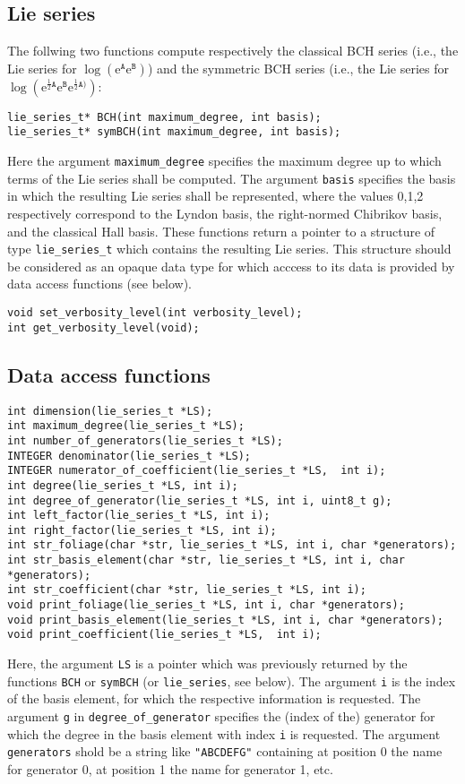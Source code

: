 \documentclass[11pt,a4paper]{article}
\newcommand{\ee}{\mathrm{e}}
\renewcommand{\AA}{\mathtt{A}}
\newcommand{\BB}{\mathtt{B}}
\begin{document}
\subsection{Lie series}
The follwing two functions compute respectively the classical BCH series
(i.e., the Lie series for $\log(\ee^{\AA}\ee^{\BB})$) and
the symmetric BCH series (i.e., the Lie series for 
$\log(\ee^{\frac{1}{2}\AA}\ee^{\BB}\ee^{\frac{1}{2}\AA)})$:
\begin{verbatim}
lie_series_t* BCH(int maximum_degree, int basis);
lie_series_t* symBCH(int maximum_degree, int basis);
\end{verbatim}
Here the argument \verb|maximum_degree| specifies the maximum degree
up to which terms of the Lie series shall be computed. The argument
\verb|basis| specifies the basis in which the resulting Lie series
shall be represented, where the values 0,1,2 respectively correspond to the
Lyndon basis, the right-normed Chibrikov basis, and the classical Hall basis.
These functions return a pointer to a structure of type \verb|lie_series_t| which 
contains the resulting Lie series. 
This structure should be considered as an opaque data type for 
which acccess to its data is provided by data access functions (see below).
\begin{verbatim}
void set_verbosity_level(int verbosity_level);
int get_verbosity_level(void);
\end{verbatim}

\subsection{Data access functions}
\begin{verbatim}
int dimension(lie_series_t *LS);
int maximum_degree(lie_series_t *LS);
int number_of_generators(lie_series_t *LS);
INTEGER denominator(lie_series_t *LS);
INTEGER numerator_of_coefficient(lie_series_t *LS,  int i);
int degree(lie_series_t *LS, int i);
int degree_of_generator(lie_series_t *LS, int i, uint8_t g);
int left_factor(lie_series_t *LS, int i);
int right_factor(lie_series_t *LS, int i);
int str_foliage(char *str, lie_series_t *LS, int i, char *generators);
int str_basis_element(char *str, lie_series_t *LS, int i, char *generators);
int str_coefficient(char *str, lie_series_t *LS, int i);
void print_foliage(lie_series_t *LS, int i, char *generators);
void print_basis_element(lie_series_t *LS, int i, char *generators);
void print_coefficient(lie_series_t *LS,  int i);
\end{verbatim}
Here, the argument \verb|LS| is a pointer which was
previously returned by the functions \verb|BCH| or \verb|symBCH|
(or \verb|lie_series|, see below).
The argument \verb|i| is the index of the basis element, for which
the respective information is requested.
The argument \verb|g| in \verb|degree_of_generator| specifies
the (index of the) generator for which the degree in the basis element with
index \verb|i| is requested.
The argument \verb|generators| shold be a string like \verb|"ABCDEFG"| containing at 
position 0 the name for generator 0, at position 1 the name for generator 1, etc.
\end{document}

